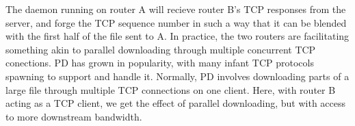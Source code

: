 \documentclass{article}
\begin{document}
The daemon running on router A will recieve router B's TCP responses from the server, and forge the TCP sequence number in such a way that it can be blended with the first half of the file sent to A. In practice, the two routers are facilitating something akin to parallel downloading through multiple concurrent TCP conections. PD has grown in popularity, with many infant TCP protocols spawning to support and handle it. Normally, PD involves downloading parts of a large file through multiple TCP connections on one client. Here, with router B acting as a TCP client, we get the effect of parallel downloading, but with access to more downstream bandwidth. 
\end{document}
